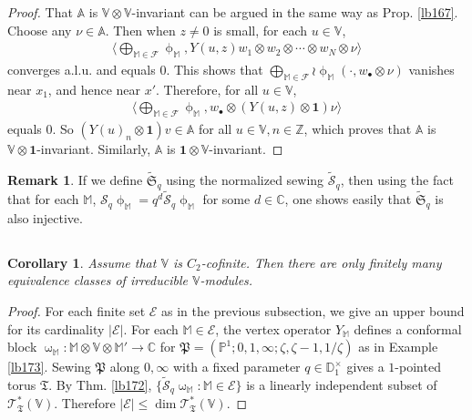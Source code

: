 \documentclass[12pt,a4paper,notitlepage]{article}
\theoremstyle{definition}
\newtheorem{rem}[df]{Remark}
\theoremstyle{plain}
\newtheorem{co}[df]{Corollary}
\newcommand{\fk}{\mathfrak}
\newcommand{\mc}{\mathcal}
\newcommand{\wtd}{\widetilde}
\newcommand{\id}{\mathbf{1}}
\newcommand{\bigbk}[1]{\big\langle {#1}\big\rangle}
\newcommand{\scr}{\mathscr}
\newcommand{\blt}{\bullet}
\newcommand{\Vbb}{\mathbb V}
\newcommand{\Abb}{\mathbb A}
\newcommand{\Mbb}{\mathbb M}
\newcommand{\Cbb}{\mathbb C}
\newcommand{\Zbb}{\mathbb Z}
\newcommand{\Pbb}{\mathbb P}
\newcommand{\Dbb}{\mathbb D}
\numberwithin{equation}{section}
\begin{document}
\begin{proof}
That $\Abb$ is $\Vbb\otimes\Vbb$-invariant can be argued in the same way as Prop. \ref{lb167}. Choose any $\nu\in\Abb$. Then when $z\neq 0$ is small, for each $u\in\Vbb$,
\begin{align}
\bigbk{\bigoplus_{\Mbb\in\mc F}\upphi_\Mbb,Y(u,z)w_1\otimes w_2\otimes\cdots\otimes w_N\otimes\nu}
\end{align}
converges a.l.u. and equals $0$. This shows that $\bigoplus_{\Mbb\in\mc F}\wr\upphi_\Mbb(\cdot,w_\blt\otimes\nu)$ vanishes near $x_1$, and hence near $x'$. Therefore, for all $u\in\Vbb$,
\begin{align*}
\bigbk{\bigoplus_{\Mbb\in\mc F}\upphi_\Mbb,w_\blt\otimes(Y(u,z)\otimes \id)\nu}
\end{align*}
equals $0$. So $(Y(u)_n\otimes\id)v\in\Abb$ for all $u\in\Vbb,n\in\Zbb$, which proves that $\Abb$ is $\Vbb\otimes\id$-invariant. Similarly, $\Abb$ is $\id\otimes\Vbb$-invariant.
\end{proof}

\begin{rem}
If we define $\wtd{\fk S}_q$ using the normalized sewing $\wtd{\mc S}_q$,  then using the fact that for each $\Mbb$, $\mc S_q\upphi_\Mbb=q^d\wtd{\mc S}_q\upphi_\Mbb$ for some $d\in\Cbb$, one shows easily that $\wtd{\fk S}_q$ is also injective.
\end{rem}


\subsection{}


\begin{co}\label{lb174}
Assume that $\Vbb$ is $C_2$-cofinite. Then there are only finitely many equivalence classes of irreducible $\Vbb$-modules.
\end{co}


\begin{proof}
For each finite set $\mc E$  as in the previous subsection, we give an upper bound for its cardinality $|\mc E|$. For each $\Mbb\in\mc E$, the vertex operator $Y_\Mbb$ defines a conformal block $\upomega_\Mbb:\Mbb\otimes\Vbb\otimes\Mbb'\rightarrow\Cbb$ for $\fk P=(\Pbb^1;0,1,\infty;\zeta,\zeta-1,1/\zeta)$ as in Example \ref{lb173}. Sewing $\fk P$ along $0,\infty$ with a fixed parameter $q\in\Dbb_1^\times$ gives a $1$-pointed torus $\fk T$. By Thm. \ref{lb172}, $\{\wtd{\mc S}_q\upomega_\Mbb:\Mbb\in\mc E\}$ is a linearly independent subset of $\scr T_{\fk T}^*(\Vbb)$. Therefore $|\mc E|\leq \dim\scr T_{\fk T}^*(\Vbb)$.
\end{proof}
\end{document}
